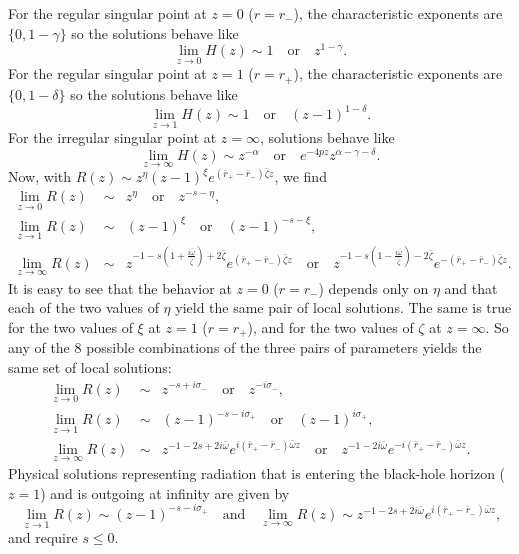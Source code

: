 \documentclass[11pt]{article}
\begin{document}
For the regular singular point at $z=0$ ($r=r_\minus$), the
characteristic exponents are $\{0,1-\gamma\}$ so the solutions behave
like
\begin{equation}
  \lim_{z\to0}H(z)\sim1 \quad\mbox{or}\quad z^{1-\gamma}.
\end{equation}
For the regular singular point at $z=1$ ($r=r_+$), the characteristic
exponents are $\{0,1-\delta\}$ so the solutions behave like
\begin{equation}
  \lim_{z\to1}H(z)\sim1 \quad\mbox{or}\quad (z-1)^{1-\delta}.
\end{equation}
For the irregular singular point at $z=\infty$, solutions behave like
\begin{equation}
  \lim_{z\to\infty}H(z)\sim z^{-\alpha} \quad\mbox{or}\quad 
  e^{-4pz}z^{\alpha-\gamma-\delta}.
\end{equation}
Now, with $R(z)\sim z^\eta(z-1)^\xi e^{(\bar{r}_+-\bar{r}_\minus)\bar\zeta z}$, we
find
\begin{eqnarray}
  \lim_{z\to0}R(z)&\sim& z^\eta \quad\mbox{or}\quad z^{-s-\eta}, \\
  \lim_{z\to1}R(z)&\sim& (z-1)^\xi \quad\mbox{or}\quad (z-1)^{-s-\xi},\\
  \lim_{z\to\infty}R(z)&\sim& 
z^{-1-s(1+\frac{i\bar\omega}{\bar\zeta})+2\bar\zeta}e^{(\bar{r}_+-\bar{r}_\minus)\bar\zeta z} 
\quad\mbox{or}\quad 
z^{-1-s(1-\frac{i\bar\omega}{\bar\zeta})-2\bar\zeta}e^{-(\bar{r}_+-\bar{r}_\minus)\bar\zeta z}.
\end{eqnarray}
It is easy to see that the behavior at $z=0$ ($r=r_\minus$) depends
only on $\eta$ and that each of the two values of $\eta$ yield the
same pair of local solutions.  The same is true for the two values of
$\xi$ at $z=1$ ($r=r_+$), and for the two values of $\zeta$ at
$z=\infty$.  So any of the 8 possible combinations of the three pairs
of parameters yields the same set of local solutions:
\begin{eqnarray}
  \lim_{z\to0}R(z)&\sim& z^{-s+i\sigma_\minus} \quad\mbox{or}\quad z^{-i\sigma_\minus}, \\
  \lim_{z\to1}R(z)&\sim& (z-1)^{-s-i\sigma_+} \quad\mbox{or}\quad (z-1)^{i\sigma_+},\\
  \lim_{z\to\infty}R(z)&\sim& 
z^{-1-2s+2i\bar\omega}e^{i(\bar{r}_+-\bar{r}_\minus)\bar\omega z} 
\quad\mbox{or}\quad 
z^{-1-2i\bar\omega}e^{-i(\bar{r}_+-\bar{r}_\minus)\bar\omega z}.
\end{eqnarray}
Physical solutions representing radiation that is entering the black-hole
horizon ($z=1$) and is outgoing at infinity are given by
\begin{equation}\
  \lim_{z\to1}R(z)\sim (z-1)^{-s-i\sigma_+} \quad\mbox{and}\quad
  \lim_{z\to\infty}R(z)\sim 
  z^{-1-2s+2i\bar\omega}e^{i(\bar{r}_+-\bar{r}_\minus)\bar\omega z},
\end{equation}
and require $s\le0$.
\end{document}
